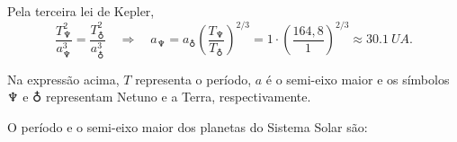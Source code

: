 \documentclass[a4paper]{article}
\newcommand\myrightarrow{\quad\Rightarrow\quad}
\begin{document}
\begin{resolucoes}
  \begin{exercicio}
   Pela terceira lei de Kepler,
  \begin{equation*}
  \frac{T_{\neptune}^2}{a_{\neptune}^3} = \frac{T_{\earth}^2}{a_{\earth}^3} \myrightarrow a_{\neptune} = a_{\earth} \left(\frac{T_{\neptune}}{T_{\earth}}\right)^{2/3} = 1 \cdot \left(\frac{164,8}{1}\right)^{2/3} \approx \SI{30.1}{UA}.
  \end{equation*}
  
  Na expressão acima, $T$ representa o período, $a$ é o semi-eixo maior e os símbolos $\neptune$ e $\earth$ representam Netuno e a Terra, respectivamente.
  \end{exercicio}
  
  \begin{exercicio}
  
  \begin{compactenum}[(a)]
  \item O período e o semi-eixo maior dos planetas do Sistema Solar são:
  

\end{compactenum}
\end{exercicio}
\end{resolucoes}
\end{document}
